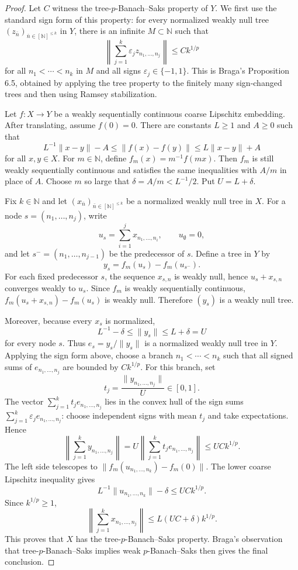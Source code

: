 \documentclass[11pt]{amsart}
\newcommand{\N}{\mathbb N}
\newcommand{\eps}{\varepsilon}
\begin{document}
\begin{proof}
Let \(C\) witness the tree-\(p\)-Banach--Saks property of \(Y\).  We first use the standard sign form of this property: for every normalized weakly null tree \((z_{\bar n})_{\bar n\in[\N]^{\le k}}\) in \(Y\), there is an infinite \(M\subset\N\) such that
\[
  \left\|\sum_{j=1}^k \eps_j z_{n_1,\ldots,n_j}\right\|
  \le C k^{1/p}
\]
for all \(n_1<\cdots<n_k\) in \(M\) and all signs \(\eps_j\in\{-1,1\}\).  This is Braga's Proposition 6.5, obtained by applying the tree property to the finitely many sign-changed trees and then using Ramsey stabilization.

Let \(f:X\to Y\) be a weakly sequentially continuous coarse Lipschitz embedding.  After translating, assume \(f(0)=0\).  There are constants \(L\ge1\) and \(A\ge0\) such that
\[
  L^{-1}\|x-y\| - A
  \le \|f(x)-f(y)\|
  \le L\|x-y\| + A
\]
for all \(x,y\in X\).  For \(m\in\N\), define \(f_m(x)=m^{-1}f(mx)\).  Then \(f_m\) is still weakly sequentially continuous and satisfies the same inequalities with \(A/m\) in place of \(A\).  Choose \(m\) so large that \(\delta=A/m<L^{-1}/2\).  Put \(U=L+\delta\).

Fix \(k\in\N\) and let \((x_{\bar n})_{\bar n\in[\N]^{\le k}}\) be a normalized weakly null tree in \(X\).  For a node \(s=(n_1,\ldots,n_j)\), write
\[
  u_s=\sum_{i=1}^j x_{n_1,\ldots,n_i},
  \qquad u_\emptyset=0,
\]
and let \(s^{-}=(n_1,\ldots,n_{j-1})\) be the predecessor of \(s\).  Define a tree in \(Y\) by
\[
  y_s=f_m(u_s)-f_m(u_{s^-}).
\]
For each fixed predecessor \(s\), the sequence \(x_{s,n}\) is weakly null, hence \(u_s+x_{s,n}\) converges weakly to \(u_s\).  Since \(f_m\) is weakly sequentially continuous, \(f_m(u_s+x_{s,n})-f_m(u_s)\) is weakly null.  Therefore \((y_s)\) is a weakly null tree.

Moreover, because every \(x_s\) is normalized,
\[
  L^{-1}-\delta \le \|y_s\| \le L+\delta=U
\]
for every node \(s\).  Thus \(e_s=y_s/\|y_s\|\) is a normalized weakly null tree in \(Y\).  Applying the sign form above, choose a branch \(n_1<\cdots<n_k\) such that all signed sums of \(e_{n_1,\ldots,n_j}\) are bounded by \(Ck^{1/p}\).  For this branch, set
\[
  t_j=\frac{\|y_{n_1,\ldots,n_j}\|}{U}\in[0,1].
\]
The vector \(\sum_{j=1}^k t_j e_{n_1,\ldots,n_j}\) lies in the convex hull of the sign sums \(\sum_{j=1}^k \eps_j e_{n_1,\ldots,n_j}\): choose independent signs with mean \(t_j\) and take expectations.  Hence
\[
  \left\|\sum_{j=1}^k y_{n_1,\ldots,n_j}\right\|
  = U\left\|\sum_{j=1}^k t_j e_{n_1,\ldots,n_j}\right\|
  \le U C k^{1/p}.
\]
The left side telescopes to \(\|f_m(u_{n_1,\ldots,n_k})-f_m(0)\|\).  The lower coarse Lipschitz inequality gives
\[
  L^{-1}\|u_{n_1,\ldots,n_k}\|-\delta
  \le U C k^{1/p}.
\]
Since \(k^{1/p}\ge1\),
\[
  \left\|\sum_{j=1}^k x_{n_1,\ldots,n_j}\right\|
  \le L(UC+\delta) k^{1/p}.
\]
This proves that \(X\) has the tree-\(p\)-Banach--Saks property.  Braga's observation that tree-\(p\)-Banach--Saks implies weak \(p\)-Banach--Saks then gives the final conclusion.
\end{proof}
\end{document}
